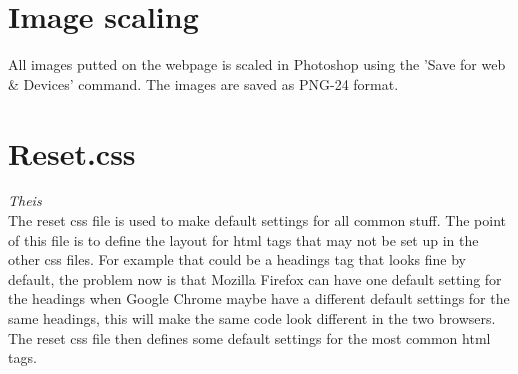 \section{Image scaling}
All images putted on the webpage is scaled in Photoshop using the 'Save for web \& Devices' command. The images are saved as PNG-24 format.

\section{Reset.css} \textit{Theis}\\
The reset css file is used to make default settings for all common stuff. The point of this file is to define the layout for html tags that may not be set up in the other css files. For example that could be a headings tag that looks fine by default, the problem now is that Mozilla Firefox can have one default setting for the headings when Google Chrome maybe have a different default settings for the same headings, this will make the same code look different in the two browsers. The reset css file then defines some default settings for the most common html tags.
